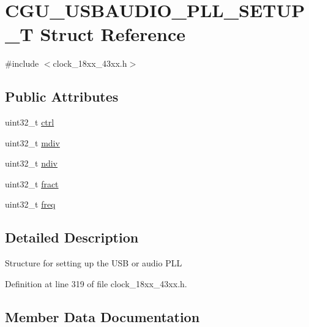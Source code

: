 \hypertarget{struct_c_g_u___u_s_b_a_u_d_i_o___p_l_l___s_e_t_u_p___t}{}\section{C\+G\+U\+\_\+\+U\+S\+B\+A\+U\+D\+I\+O\+\_\+\+P\+L\+L\+\_\+\+S\+E\+T\+U\+P\+\_\+T Struct Reference}
\label{struct_c_g_u___u_s_b_a_u_d_i_o___p_l_l___s_e_t_u_p___t}


{\ttfamily \#include $<$clock\+\_\+18xx\+\_\+43xx.\+h$>$}

\subsection*{Public Attributes}
\begin{DoxyCompactItemize}
\item 
uint32\+\_\+t \hyperlink{struct_c_g_u___u_s_b_a_u_d_i_o___p_l_l___s_e_t_u_p___t_a280057264935d15e3ec32f0863984b3f}{ctrl}
\item 
uint32\+\_\+t \hyperlink{struct_c_g_u___u_s_b_a_u_d_i_o___p_l_l___s_e_t_u_p___t_a7a942f1d1b5c4cf2b23cc08fa25b5d96}{mdiv}
\item 
uint32\+\_\+t \hyperlink{struct_c_g_u___u_s_b_a_u_d_i_o___p_l_l___s_e_t_u_p___t_acadce9c1aeee23867156378a92889512}{ndiv}
\item 
uint32\+\_\+t \hyperlink{struct_c_g_u___u_s_b_a_u_d_i_o___p_l_l___s_e_t_u_p___t_a2b40fae651a73ad252a164948a554a49}{fract}
\item 
uint32\+\_\+t \hyperlink{struct_c_g_u___u_s_b_a_u_d_i_o___p_l_l___s_e_t_u_p___t_a0d0c28f5e6cb5c7f375a4a1031c73209}{freq}
\end{DoxyCompactItemize}


\subsection{Detailed Description}
Structure for setting up the U\+SB or audio P\+LL 

Definition at line 319 of file clock\+\_\+18xx\+\_\+43xx.\+h.



\subsection{Member Data Documentation}
\mbox{\label{struct_c_g_u___u_s_b_a_u_d_i_o___p_l_l___s_e_t_u_p___t_a280057264935d15e3ec32f0863984b3f}} 
